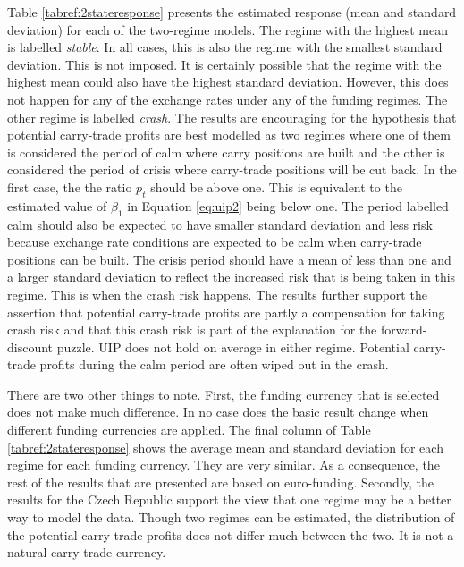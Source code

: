 \documentclass[12pt, a4paper, oneside]{article}\usepackage[]{graphicx}\usepackage[]{color}
\begin{document}
Table \ref{tabref:2stateresponse} presents the estimated response (mean and standard deviation) for each of the two-regime models. The regime with the highest mean is labelled \emph{stable}.  In all cases, this is also the regime with the smallest standard deviation.  This is not imposed.  It is certainly possible that the regime with the highest mean could also have the highest standard deviation.  However, this does not happen for any of the exchange rates under any of the funding regimes.  The other regime is labelled \emph{crash}.  The results are encouraging for the hypothesis that potential carry-trade profits are best modelled as two regimes where one of them is considered the period of calm where carry positions are built and the other is considered the period of crisis where carry-trade positions will be cut back.  In the first case, the the ratio $p_t$ should be above one.  This is equivalent to the estimated value of $\beta_1$ in Equation \ref{eq:uip2} being below one.  The period labelled calm should also be expected to have smaller standard deviation and less risk because exchange rate conditions are expected to be calm when carry-trade positions can be built.  The crisis period should have a mean of less than one and a larger standard deviation to reflect the increased risk that is being taken in this regime. This is when the crash risk happens. The results further support the assertion that potential carry-trade profits are partly a compensation for taking crash risk and that this crash risk is part of the explanation for the forward-discount puzzle. UIP does not hold on average in either regime. Potential carry-trade profits during the calm period are often wiped out in the crash.

There are two other things to note.  First, the funding currency that is selected does not make much difference.   In no case does the basic result change when different funding currencies are applied. The final column of Table \ref{tabref:2stateresponse} shows the average mean and standard deviation for each regime for each funding currency.  They are very similar. As a consequence, the rest of the results that are presented are based on euro-funding.  Secondly, the results for the Czech Republic support the view that one regime may be a better way to model the data. Though two regimes can be estimated, the distribution of the potential carry-trade profits does not differ much between the two. It is not a natural carry-trade currency. 
\end{document}
